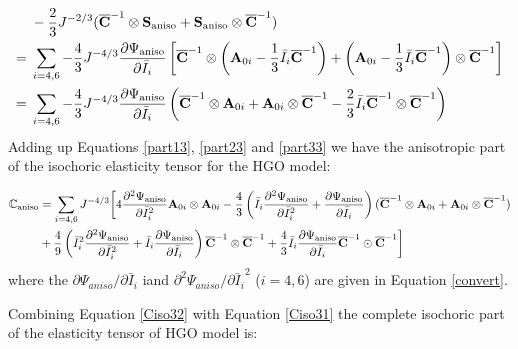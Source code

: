 \begin{equation} \label{part33}
\begin{split}
&-\frac{2}{3}J^{-2/3}({\overline{\bold{C}}}^{-1} \otimes \bold{S}_\mathrm{aniso} + \bold{S}_\mathrm{aniso} \otimes {\overline{\bold{C}}}^{-1}) \\
= {} &
\sum_{i = 4, 6} -\frac{4}{3}J^{-4/3}\frac{\partial\Psi_\mathrm{aniso}}{\partial\bar{I}_i}
\left[ \overline{\bold{C}}^{-1} \otimes \left( \bold{A}_{0i} - \frac{1}{3}\bar{I}_i \overline{\bold{C}}^{-1} \right)
+ \left( \bold{A}_{0i} - \frac{1}{3}\bar{I}_i \overline{\bold{C}}^{-1} \right) \otimes \overline{\bold{C}}^{-1} \right] \\
= {} & \sum_{i = 4, 6} -\frac{4}{3}J^{-4/3}\frac{\partial\Psi_\mathrm{aniso}}{\partial\bar{I}_i}
\left( \overline{\bold{C}}^{-1} \otimes \bold{A}_{0i} + \bold{A}_{0i} \otimes \overline{\bold{C}}^{-1} 
- \frac{2}{3} \bar{I}_i \overline{\bold{C}}^{-1} \otimes \overline{\bold{C}}^{-1} \right) \\
\end{split}
\end{equation}
Adding up Equations \ref{part13}, \ref{part23} and \ref{part33} we have the anisotropic part of the isochoric elasticity tensor for the HGO model:

\begin{equation} \label{Ciso31}
\begin{split}
\mathbb{C}_\mathrm{aniso} 
&= \sum_{i = 4, 6} J^{-4/3} \bigg[ 4\frac{\partial^2\Psi_\mathrm{aniso}}{\partial{\bar{I}_i}^2} \bold{A}_{0i} \otimes \bold{A}_{0i} - \frac{4}{3} \left( \bar{I}_i\frac{\partial^2\Psi_\mathrm{aniso}}{\partial{\bar{I}_i}^2} + \frac{\partial\Psi_\mathrm{aniso}}{\partial{\bar{I}_i}} \right) (\overline{\bold{C}}^{-1} \otimes \bold{A}_{0i} + \bold{A}_{0i} \otimes \overline{\bold{C}}^{-1}) \\
&+ \frac{4}{9} \left( {\bar{I}_i}^2\frac{\partial^2\Psi_\mathrm{aniso}}{\partial{\bar{I}_i}^2} + \bar{I}_i\frac{\partial\Psi_\mathrm{aniso}}{\partial{\bar{I}_i}} \right) \overline{\bold{C}}^{-1} \otimes \overline{\bold{C}}^{-1} 
+ \frac{4}{3}\bar{I}_i \frac{\partial\Psi_\mathrm{aniso}}{\partial{\bar{I}_i}} \overline{\bold{C}}^{-1} \odot \overline{\bold{C}}^{-1} \bigg]
\end{split}
\end{equation}
where the $\partial\Psi_{aniso}/\partial{\bar{I}_i}$ iand $\partial^2\Psi_{aniso}/{\partial{\bar{I}_i}^2}$ ($i = 4, 6$) are given in Equation \ref{convert}.

Combining Equation \ref{Ciso32} with Equation \ref{Ciso31} the complete isochoric part of the elasticity tensor of HGO model is:

